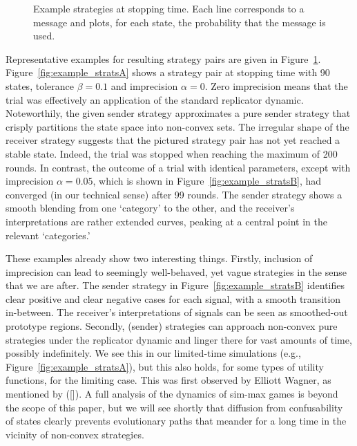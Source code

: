 \documentclass[12pt,english]{article}
\newcommand{\imprecision}{\ensuremath{\alpha}} %
\newcommand{\toler}{\ensuremath{\beta}} %
\newcommand{\ns}{\ensuremath{n_s}} %
\numberwithin{equation}{section}
\newcommand{\citetbjps}[1]{\citeauthor{#1} ([\citeyear{#1}])}
\begin{document}
\begin{figure}


  \caption{Example strategies at stopping time. Each line corresponds to a message and plots, for each state, the probability that the message is used.}
  \label{fig:example_strats}
\end{figure}

Representative examples for resulting strategy pairs are given in
Figure~\ref{fig:example_strats}. Figure~\ref{fig:example_stratsA} shows a strategy pair at
stopping time with 90 states, tolerance $\toler = 0.1$ and imprecision $\imprecision = 0$. Zero
imprecision means that the trial was effectively an application of the standard replicator dynamic. Noteworthily,
the given sender strategy approximates a pure sender strategy that crisply partitions the state
space into non-convex sets. The irregular shape of the receiver strategy suggests that the
pictured strategy pair has not yet reached a stable state. Indeed,
the trial was stopped when reaching the maximum of 200 rounds. In contrast, the outcome of a
trial with identical parameters, except with imprecision $\imprecision = 0.05$, which is shown
in Figure~\ref{fig:example_stratsB}, had converged (in our technical sense) after 99
rounds. The sender strategy shows a smooth blending from one `category' to the other, and the
receiver's interpretations are rather extended curves, peaking at a central point in the
relevant `categories.'

These examples already show two interesting things. Firstly, inclusion of imprecision can lead
to seemingly well-behaved, yet vague strategies in the sense that we are after. The sender
strategy in Figure~\ref{fig:example_stratsB} identifies clear positive and clear negative cases
for each signal, with a smooth transition in-between. The receiver's interpretations of signals
can be seen as smoothed-out prototype regions. Secondly, (sender) strategies can approach
non-convex pure strategies under the replicator dynamic and linger there for vast amounts of
time, possibly indefinitely. We see this in our limited-time simulations (e.g.,
Figure~\ref{fig:example_stratsA}), but this also holds, for some types of utility functions,
for the limiting case. This was first observed by Elliott Wagner, as mentioned by
\citetbjps{OConnor2014-OCOEPC}.  A full analysis of the dynamics of sim-max games is beyond the
scope of this paper, but we will see shortly that diffusion from confusability of states
clearly prevents evolutionary paths that meander for a long time in the vicinity of non-convex
strategies.
\end{document}
